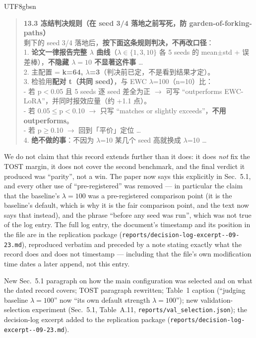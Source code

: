 \begin{CJK}{UTF8}{gbsn}
\begin{quote}\small
\textbf{13.3 冻结判决规则（在 seed 3/4 落地之前写死，防 garden-of-forking-paths）}\\
剩下的 seed 3/4 落地后，\textbf{按下面这条规则判决，不再改口径}：\\
1. \textbf{论文一律报告完整 $\lambda$ 曲线}（$\lambda\in\{1,3,10\}$ 各 5 seeds 的
mean$\pm$std + 误差棒），\textbf{不隐藏 $\lambda=10$ 不显著这件事} \ldots\\
2. 主配置 = \textbf{k=64, $\lambda$=3}（判决前已定，不是看到结果才定）。\\
3. 检验用\textbf{配对 t（共同 seed）}，与 EWC $\lambda$=100（n=10）比：\\
- 若 p$<$0.05 且 5 seeds 逐 seed 差全为正 $\rightarrow$ 可写 ``outperforms EWC-LoRA''，并同时报效应量（约 +1.1 点）。\\
- 若 0.05$\le$p$<$0.10 $\rightarrow$ 只写 ``matches or slightly exceeds''，\textbf{不用 outperforms}。\\
- 若 p$\ge$0.10 $\rightarrow$ 回到「平价」定位 \ldots\\
4. \textbf{绝不做的事}：不因为 $\lambda$=10 某几个 seed 高就换成 $\lambda$=10 \ldots
\end{quote}
\end{CJK}

We do not claim that this record extends further than it does: it does \emph{not} fix the TOST
margin, it does not cover the second benchmark, and the final verdict it produced was
``parity'', not a win. The paper now says this explicitly in Sec.~5.1, and every
other use of ``pre-registered'' was removed --- in particular the claim that the baseline's
$\lambda{=}100$ was a pre-registered comparison point (it is the baseline's default, which is
why it is the fair comparison point, and the text now says that instead), and the phrase
``before any seed was run'', which was not true of the log entry. The full log entry, the
document's timestamp and its position in the file are in the replication package
(\texttt{reports/\allowbreak decision-log-excerpt--09-23.md}), reproduced
verbatim and preceded by a note stating exactly what the record does and does not
timestamp --- including that the file's own modification time dates a later append, not
this entry.

\change New Sec.~5.1 paragraph on how the main configuration was selected and on
what the dated record covers; TOST paragraph rewritten; Table~1 caption
(``judging baseline $\lambda{=}100$'' now ``its own default strength $\lambda{=}100$'');
new validation-selection experiment (Sec.~5.1,
Table~A.11, \texttt{reports/val\_selection.json}); the decision-log excerpt added to the
replication package (\texttt{reports/\allowbreak decision-log-excerpt--09-23.md}).

